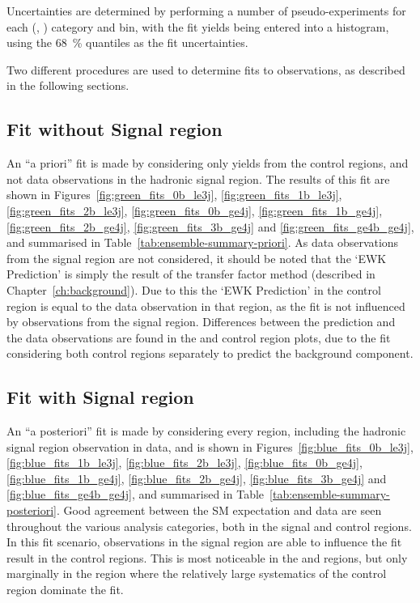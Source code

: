 Uncertainties are determined by performing a number of pseudo-experiments for
each (\nb, \nj) category and \HT bin, with the fit yields being entered into a
histogram, using the 68~\% quantiles as the fit uncertainties.

Two different procedures are used to determine fits to observations, as described
in the following sections.

\subsection{Fit without Signal region}
\label{sec:results_fit_green}
An ``a priori'' fit is made by considering only yields from the control regions,
and not data observations in the hadronic signal region. The results of this fit
are shown in Figures~\ref{fig:green_fits_0b_le3j}, \ref{fig:green_fits_1b_le3j}, \ref{fig:green_fits_2b_le3j}, \ref{fig:green_fits_0b_ge4j}, \ref{fig:green_fits_1b_ge4j}, \ref{fig:green_fits_2b_ge4j}, \ref{fig:green_fits_3b_ge4j} and \ref{fig:green_fits_ge4b_ge4j},
and summarised in Table~\ref{tab:ensemble-summary-priori}. As data
observations from the signal region are not considered, it should be noted that
the `EWK Prediction' is simply the result of the transfer factor method
(described in Chapter~\ref{ch:background}). Due to this the `EWK 
Prediction' in the \mj control region is equal to the data observation in
that region, as the fit is not influenced by observations from the signal region.
Differences between the prediction and the data observations are found in the
\mmj and \gj control region plots, due to the fit considering both control regions
separately to predict the \zinv background component.

\subsection{Fit with Signal region}
\label{sec:results_fit_blue}
An ``a posteriori'' fit is made by considering every region, including the
hadronic signal region observation in data, and is shown in
Figures~\ref{fig:blue_fits_0b_le3j}, \ref{fig:blue_fits_1b_le3j}, \ref{fig:blue_fits_2b_le3j}, \ref{fig:blue_fits_0b_ge4j}, \ref{fig:blue_fits_1b_ge4j}, \ref{fig:blue_fits_2b_ge4j}, \ref{fig:blue_fits_3b_ge4j} and \ref{fig:blue_fits_ge4b_ge4j},
and summarised in Table~\ref{tab:ensemble-summary-posteriori}. Good agreement
between the SM expectation and data are seen throughout the various analysis
categories, both in the signal and control regions. In this fit scenario,
observations in the signal region are able to influence the
fit result in the control regions. This is most noticeable in the \mmj and \gj regions,
but only marginally in the \mj region where the relatively large systematics of
the control region dominate the fit. 

